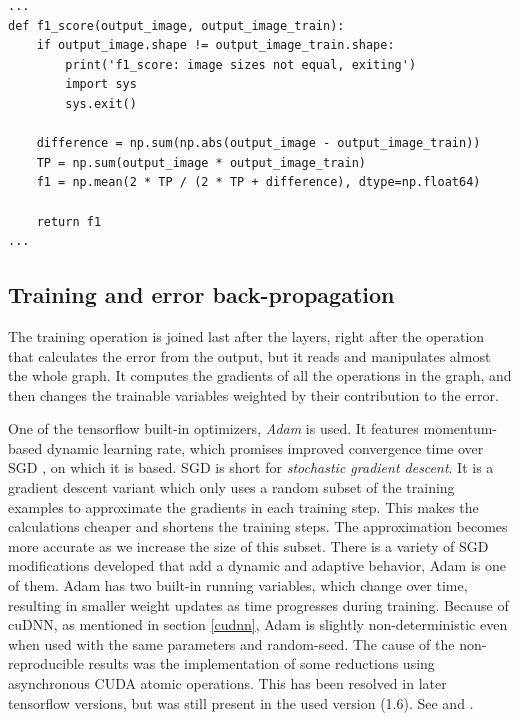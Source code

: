 \documentclass[12pt]{report}
\begin{document}
\begin{center}
	\begin{minipage}{0.95\textwidth}
		\begin{lstlisting}[title=metrics.py]
...
def f1_score(output_image, output_image_train):
	if output_image.shape != output_image_train.shape:
		print('f1_score: image sizes not equal, exiting')
		import sys
		sys.exit()

	difference = np.sum(np.abs(output_image - output_image_train))
	TP = np.sum(output_image * output_image_train)
	f1 = np.mean(2 * TP / (2 * TP + difference), dtype=np.float64)

	return f1
...
		\end{lstlisting}
	\end{minipage}
\end{center}

\subsection{Training and error back-propagation} \label{train}
The training operation is joined last after the layers, right after the operation that calculates the error from the output, but it reads and manipulates almost the whole graph. It computes the gradients of all the operations in the graph, and then changes the trainable variables weighted by their contribution to the error.

One of the tensorflow built-in optimizers, \textit{Adam} \cite{adam} is used. It features momentum-based dynamic learning rate, which promises improved convergence time over SGD \cite{sgd}, on which it is based. SGD is short for \textit{stochastic gradient descent}. It is a gradient descent variant which only uses a random subset of the training examples to approximate the gradients in each training step. This makes the calculations cheaper and shortens the training steps. The approximation becomes more accurate as we increase the size of this subset. There is a variety of SGD modifications developed that add a dynamic and adaptive behavior, Adam is one of them. Adam has two built-in running variables, which change over time, resulting in smaller weight updates as time progresses during training. Because of cuDNN, as mentioned in section \ref{cudnn}, Adam is slightly non-deterministic even when used with the same parameters and random-seed. The cause of the non-reproducible results was the implementation of some reductions using asynchronous CUDA atomic operations. This has been resolved in later tensorflow versions, but was still present in the used version (1.6). See \cite{nondet1} and \cite{nondet2}.
\end{document}
